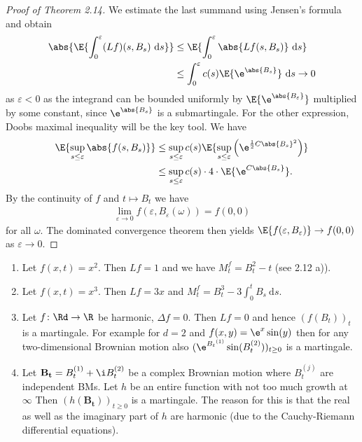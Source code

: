 \begin{proof}[Proof of Theorem 2.14]
We estimate the last summand using Jensen's formula and obtain
\begin{align*}
\abs{\E{\int_0^\varepsilon (Lf)(s,B_s)~\mathrm{d}s}}& \leq \E{\int_0^\varepsilon \abs{Lf(s,B_s)}~\mathrm{d}s}\\
&\leq \int_0^\varepsilon c(s)\E{\e^{\abs{B_s}}}~\mathrm{d}s \to 0
\end{align*}
as $\varepsilon<0$ as the integrand can be bounded uniformly by $\E{\e^{\abs{B_\varepsilon}}}$ multiplied by some constant, since $\e^{\abs{B_s}}$ is a submartingale.
For the other expression, Doobs maximal inequality will be the key tool.
We have
\begin{align*}
\E{\sup_{s\leq \varepsilon}\abs{f(s,B_s)}} &\leq \sup_{s\leq \varepsilon} c(s)\E{\sup_{s\leq \varepsilon} \left( \e^{\frac{1}{2}C \abs{B_s}^2}\right)}\\
&\leq \sup_{s\leq \varepsilon} c(s) \cdot 4 \cdot  \E{\e^{C \abs{B_s}}}.
\end{align*}
By the continuity of $f$ and $t\mapsto B_t$ we have
\begin{align*}
\lim_{\varepsilon \to 0} f(\varepsilon,B_\varepsilon(\omega))=f(0,0)
\end{align*}
for all $\omega$.
The dominated convergence theorem then yields $\E{f(\varepsilon,B_\varepsilon)} \to f(0,0)$ as $\varepsilon \to 0$.
\end{proof}

\begin{bsp}
\begin{enumerate}[label=\alph*)]
\item Let $f(x,t)=x^2$. Then $Lf=1$ and we have $M_t^f=B_t^2-t$ (see 2.12 a)).
\item Let $f(x,t)=x^3$. Then $Lf=3x$ and $M_t^f=B_t^3-3 \int_0^t B_s~\mathrm{d}s$.
\item Let $f \colon \Rd \to \R$ be harmonic, \ie $\Delta f=0$.
Then $Lf=0$ and hence $(f(B_t))_t$ is a martingale.
For example for $d=2$ and $f(x,y)=\e^x\sin(y)$ then for any two-dimensional Brownian motion also $(\e^{{B_t}^{(1)}}\sin(B_t^{(2)}))_{t\geq 0}$ is a martingale.
\item Let $\mathbf{B_t}=B_t^{(1)}+\i B_t^{(2)}$ be a complex Brownian motion where $B_t^{(j)}$ are independent BMs.
Let $h$ be an entire function with not too much growth at $\infty$
Then $(h(\mathbf{B_t}))_{t \geq 0}$ is a martingale.
The reason for this is that the real as well as the imaginary part of $h$ are harmonic (due to the Cauchy-Riemann differential equations).
\end{enumerate}
\end{bsp}

